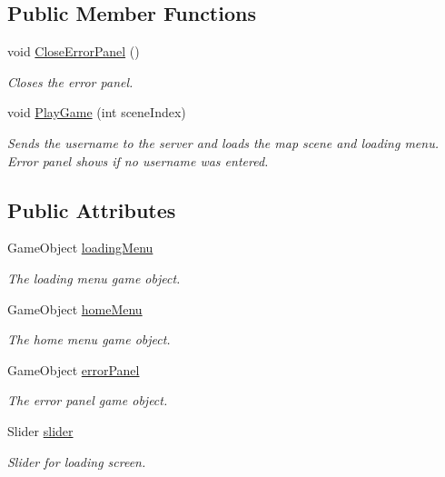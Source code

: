 \subsection*{Public Member Functions}
\begin{DoxyCompactItemize}
\item 
void \mbox{\hyperlink{class_welcome_menu_a9846e9fbed6c907ed83f6137b7a82b86}{Close\+Error\+Panel}} ()
\begin{DoxyCompactList}\small\item\em Closes the error panel. \end{DoxyCompactList}\item 
void \mbox{\hyperlink{class_welcome_menu_a32c738d5cd2259a5ca5a40a41f96a501}{Play\+Game}} (int scene\+Index)
\begin{DoxyCompactList}\small\item\em Sends the username to the server and loads the map scene and loading menu. Error panel shows if no username was entered. \end{DoxyCompactList}\end{DoxyCompactItemize}
\subsection*{Public Attributes}
\begin{DoxyCompactItemize}
\item 
Game\+Object \mbox{\hyperlink{class_welcome_menu_ab63c6cc689c30a12f0e3e00cc5b584e8}{loading\+Menu}}
\begin{DoxyCompactList}\small\item\em The loading menu game object. \end{DoxyCompactList}\item 
Game\+Object \mbox{\hyperlink{class_welcome_menu_a9fca6731d74309a517ff9e027c2eb7f3}{home\+Menu}}
\begin{DoxyCompactList}\small\item\em The home menu game object. \end{DoxyCompactList}\item 
Game\+Object \mbox{\hyperlink{class_welcome_menu_a61a3e2ae97be88313e06aed7e65b9af4}{error\+Panel}}
\begin{DoxyCompactList}\small\item\em The error panel game object. \end{DoxyCompactList}\item 
Slider \mbox{\hyperlink{class_welcome_menu_a05c5a113d36a31c141bb686cd8242d92}{slider}}
\begin{DoxyCompactList}\small\item\em Slider for loading screen. \end{DoxyCompactList}\end{DoxyCompactItemize}
